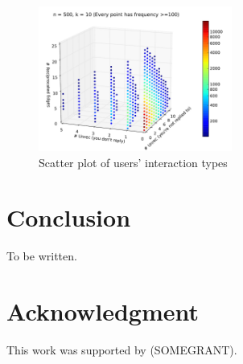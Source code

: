 \documentclass[conference]{IEEEtran}
\begin{document}

\begin{figure}[!t]
\centering
\includegraphics[width=2.5in]{scatter3}
\caption{Scatter plot of users' interaction types}
\label{fig_rur_sca2}
\end{figure}

%
%

\section{Conclusion}
To be written.


\section*{Acknowledgment}
 This work was supported by (SOMEGRANT).




\end{document}
